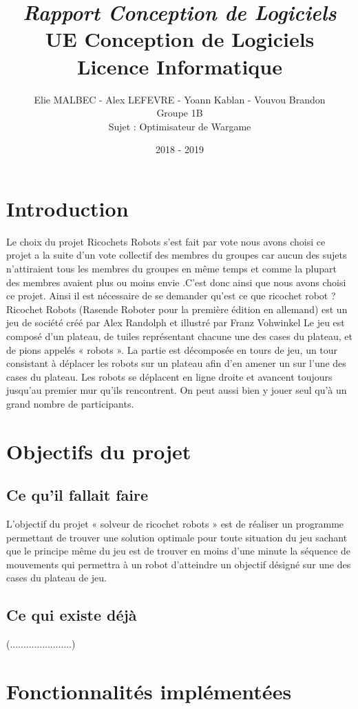 \documentclass[a4paper]{article} %
\title{
\LARGE{\em{Rapport Conception de Logiciels}}\\\vspace*{0.5cm}
UE Conception de Logiciels\\
Licence Informatique
}
\author{
Elie MALBEC - Alex LEFEVRE -  Yoann Kablan - Vouvou Brandon\\
Groupe 1B\\
Sujet : Optimisateur de Wargame
}
\date{2018 - 2019}
\begin{document}
\newpage
\newpage
	\null %
\newpage

\tableofcontents
\newpage

\section{Introduction}
Le choix du projet Ricochets Robots s’est fait par vote nous avons choisi ce projet a la suite d’un vote collectif des membres du groupes car aucun des sujets n’attiraient tous les membres du groupes en même temps  et comme la plupart des membres avaient plus ou moins envie .C’est donc ainsi que nous avons choisi ce projet.
Ainsi il est nécessaire de se demander qu’est ce que ricochet robot ? 
Ricochet Robots  (Rasende Roboter pour la première édition en allemand) est un jeu de société créé par Alex Randolph  et illustré par Franz Vohwinkel
Le jeu est composé d'un plateau, de tuiles représentant chacune une des cases du plateau, et de pions appelés « robots ». La partie est décomposée en tours de jeu, un tour consistant à déplacer les robots sur un plateau afin d'en amener un sur l'une des cases du plateau. Les robots se déplacent en ligne droite et avancent toujours jusqu'au premier mur qu'ils rencontrent. On peut aussi bien y jouer seul qu'à un grand nombre de participants. 

\section{Objectifs du projet}	
	\subsection{Ce qu’il fallait faire}
L’objectif du projet « solveur de ricochet robots » est de réaliser un programme permettant de trouver une solution optimale pour toute situation du jeu sachant que le principe même du jeu est de trouver en moins d’une minute la séquence de mouvements qui permettra à un robot d’atteindre un objectif désigné sur une des cases du plateau de jeu.

	\subsection{Ce qui existe déjà}
(.......................)

\section{Fonctionnalités implémentées}
\end{document}
